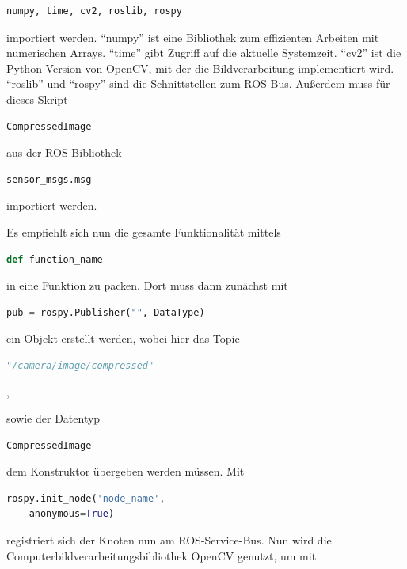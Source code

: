 \begin{lstlisting}[language=Python]
numpy, time, cv2, roslib, rospy
\end{lstlisting}

importiert werden. ``numpy'' ist eine Bibliothek zum effizienten Arbeiten mit numerischen Arrays. ``time'' gibt Zugriff auf die aktuelle Systemzeit. ``cv2'' ist die Python-Version von OpenCV, mit der die Bildverarbeitung implementiert wird. ``roslib'' und ``rospy'' sind die Schnittstellen zum ROS-Bus. Außerdem muss für dieses Skript

\begin{lstlisting}[language=Python]
CompressedImage
\end{lstlisting}aus der ROS-Bibliothek 

\begin{lstlisting}[language=Python]
sensor_msgs.msg
\end{lstlisting} importiert werden. 

Es empfiehlt sich nun die gesamte Funktionalität mittels 

\begin{lstlisting}[language=Python]
def function_name
\end{lstlisting}

in eine Funktion zu packen. Dort muss dann zunächst mit 

\begin{lstlisting}[language=Python]
pub = rospy.Publisher("", DataType)
\end{lstlisting}

ein Objekt erstellt werden, wobei hier das Topic 

\begin{lstlisting}[language=Python]
"/camera/image/compressed"
\end{lstlisting}, 

sowie der Datentyp 

\begin{lstlisting}[language=Python]
CompressedImage
\end{lstlisting} 

dem Konstruktor übergeben werden müssen. Mit 

\begin{lstlisting}[language=Python]
rospy.init_node('node_name', 
	anonymous=True)
\end{lstlisting}

registriert sich der Knoten nun am ROS-Service-Bus. Nun wird die Computerbildverarbeitungsbibliothek OpenCV genutzt, um mit 

